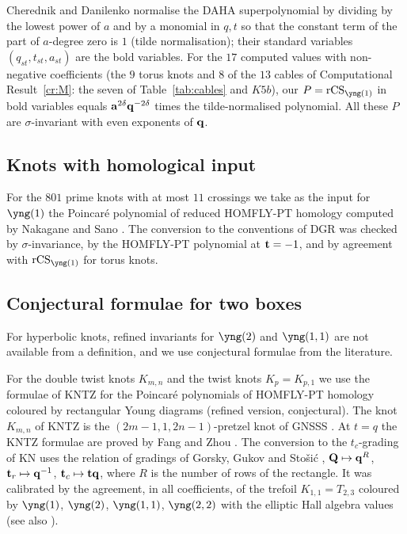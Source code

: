 \begin{remark}\label{rem:tilde}
Cherednik and Danilenko \cite{Cherednik14} normalise the DAHA superpolynomial by dividing by the lowest power of $a$ and by a monomial in $q,t$ so that the constant term of the part of $a$-degree zero is $1$ (tilde normalisation);
their standard variables $(q_{st},t_{st},a_{st})$ are the bold variables.
For the $17$ computed values with non-negative coefficients (the $9$ torus knots and $8$ of the $13$ cables of Computational Result~\ref{cr:M}: the seven of Table~\ref{tab:cables} and $K5b$), our $P=\rCS_{\yng(1)}$ in bold variables equals
$\mathbf{a}^{2\delta}\mathbf{q}^{-2\delta}$ times the tilde-normalised polynomial.
All these $P$ are $\sigma$-invariant with even exponents of $\mathbf{q}$.
\end{remark}

\subsection{Knots with homological input}
For the $801$ prime knots with at most $11$ crossings we take as the input for $\yng(1)$ the Poincar\'e polynomial of reduced HOMFLY-PT homology computed by Nakagane and Sano \cite{Nakagane21}.
The conversion to the conventions of DGR was checked by $\sigma$-invariance, by the HOMFLY-PT polynomial at $\mathbf{t}=-1$, and by agreement with $\rCS_{\yng(1)}$ for torus knots.

\subsection{Conjectural formulae for two boxes}\label{sec:conj-inputs}
For hyperbolic knots, refined invariants for $\yng(2)$ and $\yng(1,1)$ are not available from a definition, and we use conjectural formulae from the literature.

For the double twist knots $K_{m,n}$ and the twist knots $K_p=K_{p,1}$
we use the formulae of KNTZ \cite{Kameyama19} for the Poincar\'e polynomials of HOMFLY-PT homology coloured by rectangular Young diagrams (refined version, conjectural).
The knot $K_{m,n}$ of KNTZ is the $(2m-1,1,2n-1)$-pretzel knot of GNSSS \cite{Gukov15}.
At $t=q$ the KNTZ formulae are proved by Fang and Zhou \cite{Fang26}.
The conversion to the $t_c$-grading of KN uses the relation of gradings of Gorsky, Gukov and Sto\v{s}i\'c \cite{Gorsky13}, $\mathbf{Q}\mapsto\mathbf{q}^R$, $\mathbf{t}_r\mapsto\mathbf{q}^{-1}$, $\mathbf{t}_c\mapsto\mathbf{t}\mathbf{q}$,
where $R$ is the number of rows of the rectangle. It was calibrated by the agreement, in all coefficients, of the trefoil $K_{1,1}=T_{2,3}$ coloured by $\yng(1)$, $\yng(2)$, $\yng(1,1)$, $\yng(2,2)$ with the elliptic Hall algebra values (see also \cite{Nawata12}).

